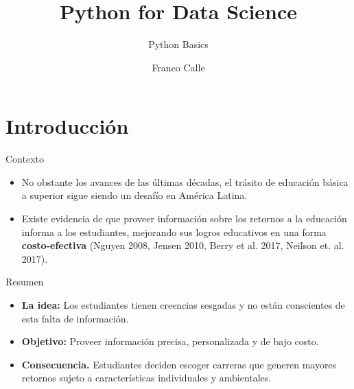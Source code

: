 \documentclass[english,spanish,aspectratio=169,11 pt,utf8]{beamer}	%
\newcommand\makebeamertitle{\frame{\maketitle}}%
\numberwithin{table}{section}
\numberwithin{figure}{section}
\theoremstyle{definition}
\theoremstyle{plain}
\theoremstyle{plain}
\theoremstyle{plain}
\begin{document}
\title{Python for Data Science}
\subtitle{Python Basics}
\author{Franco Calle}
\date{}
\thispagestyle{empty}	%
\makebeamertitle		%


\section{Introducción}

\begin{frame}{Contexto} %
	\begin{itemize}
		\setlength\itemsep{1em}
		\item No obstante los avances de las últimas décadas, el trásito de educación básica a superior sigue siendo un desafío en América Latina.
		\item Existe evidencia de que proveer información sobre los retornos a la educación informa a los estudiantes, mejorando sus logros educativos en una forma  \textbf{costo-efectiva} (Nguyen 2008, Jensen 2010, Berry et al. 2017, Neilson et. al. 2017).
	\end{itemize}
\end{frame} %

\begin{frame}{Resumen} %
	\begin{itemize}
		\setlength\itemsep{1em}
		\item \textbf{La idea:} Los estudiantes tienen creencias sesgadas y no están conscientes de esta falta de información.
		\item \textbf{Objetivo:} Proveer información precisa, personalizada y de bajo costo.
		\item  \textbf{Consecuencia.} Estudiantes deciden escoger carreras que generen mayores retornos sujeto a características individuales y ambientales.
	\end{itemize}
\end{frame} %
\end{document}

